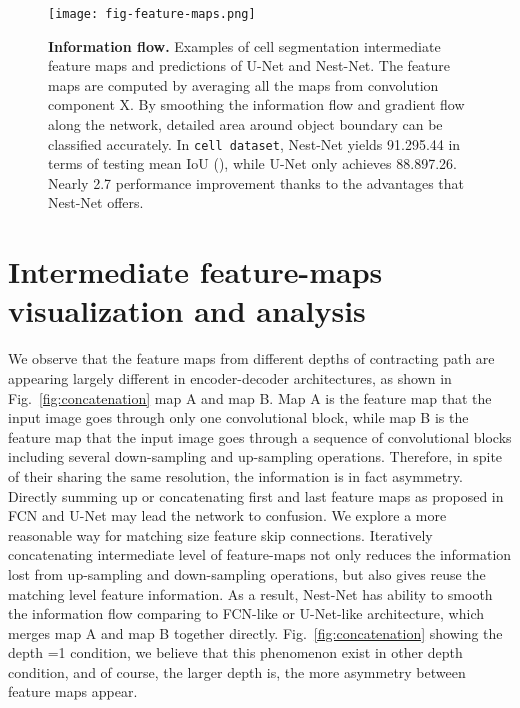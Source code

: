 \documentclass[runningheads]{llncs}
\newcommand{\bd}[1]{\textbf{#1}}
\begin{document}
\begin{figure}[t]
\begin{center}
\texttt{[image: fig-feature-maps.png]}
\end{center}
\caption{\bd{Information flow.} Examples of cell segmentation intermediate feature maps and predictions of U-Net and Nest-Net. The feature maps are computed by averaging all the maps from convolution component X. By smoothing the information flow and gradient flow along the network, detailed area around object boundary can be classified accurately. In \texttt{cell dataset}, Nest-Net yields 91.295.44 in terms of testing mean IoU (), while U-Net only achieves 88.897.26. Nearly 2.7 performance improvement thanks to the advantages that Nest-Net offers.}
\label{fig:feature_maps}
\end{figure}


\section{Intermediate feature-maps visualization and analysis}
\label{sec:feature_map}


We observe that the feature maps from different depths of contracting path are appearing largely different in encoder-decoder architectures, as shown in Fig.~\ref{fig:concatenation} map A and map B. Map A is the feature map that the input image goes through only one convolutional block, while map B is the feature map that the input image goes through a sequence of convolutional blocks including several down-sampling and up-sampling operations. Therefore, in spite of their sharing the same resolution, the information is in fact asymmetry. Directly summing up or concatenating first and last feature maps as proposed in FCN and U-Net may lead the network to confusion. We explore a more reasonable way for matching size feature skip connections. Iteratively concatenating intermediate level of feature-maps not only reduces the information lost from up-sampling and down-sampling operations, but also gives reuse the matching level feature information. As a result, Nest-Net has ability to smooth the information flow comparing to FCN-like or U-Net-like architecture, which merges map A and map B together directly. Fig.~\ref{fig:concatenation} showing the depth =1 condition, we believe that this phenomenon exist in other depth condition, and of course, the larger depth is, the more asymmetry between feature maps appear.

\iffalse
X-X represent the feature-maps of each expanding path of networks. We average all the channels and visualize the intermediate layers intuitively. Dot arrows denote single skip connection in U-Net and Nest-Net. Comparing to U-Net feature-maps, i.e., X and X, we claim that simply concatenate feature-maps between the one with rich row input information and the one with abstract feature information together will cause network confusion and result in gradient vanish. Based on the feature maps changing from X to X and segmentation performance, we observe that nesting different level feature-maps gradually can help learn more accurate segmentation and grasp more information.
\fi
\end{document}
